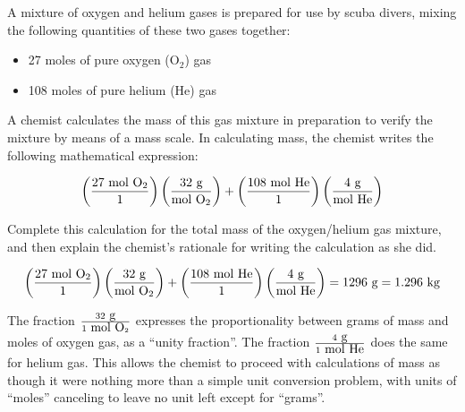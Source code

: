 

A mixture of oxygen and helium gases is prepared for use by scuba divers, mixing the following quantities of these two gases together:

\begin{itemize}
\item{} 27 moles of pure oxygen (O$_{2}$) gas
\vskip 10pt
\item{} 108 moles of pure helium (He) gas
\end{itemize}

A chemist calculates the mass of this gas mixture in preparation to verify the mixture by means of a mass scale.  In calculating mass, the chemist writes the following mathematical expression:

$$\left(27 \hbox{ mol O}_2 \over 1 \right) \left(32 \hbox{ g} \over \hbox{mol O}_2 \right) + \left(108 \hbox{ mol He} \over 1 \right) \left(4 \hbox{ g} \over \hbox{mol He} \right)$$

\vskip 10pt

Complete this calculation for the total mass of the oxygen/helium gas mixture, and then explain the chemist's rationale for writing the calculation as she did.







$$\left(27 \hbox{ mol O}_2 \over 1 \right) \left(32 \hbox{ g} \over \hbox{mol O}_2 \right) + \left(108 \hbox{ mol He} \over 1 \right) \left(4 \hbox{ g} \over \hbox{mol He} \right) = 1296 \hbox{ g} = 1.296 \hbox{ kg}$$

The fraction $32 \hbox{ g} \over 1 \hbox{ mol O}_2$ expresses the proportionality between grams of mass and moles of oxygen gas, as a ``unity fraction''.  The fraction $4 \hbox{ g} \over 1 \hbox{ mol He}$ does the same for helium gas.  This allows the chemist to proceed with calculations of mass as though it were nothing more than a simple unit conversion problem, with units of ``moles'' canceling to leave no unit left except for ``grams''.
 











